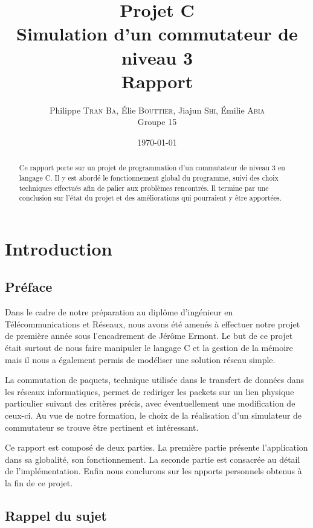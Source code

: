 \documentclass[a4paper,11pt]{article}
\title{Projet C\\Simulation d'un commutateur de niveau 3\\Rapport}
\author{Philippe \textsc{Tran Ba}, Élie \textsc{Bouttier}, Jiajun \textsc{Shi}, Émilie \textsc{Abia}\\Groupe 15}
\date\today
\begin{document}
\maketitle

\begin{abstract}

Ce rapport porte sur un projet de programmation d'un commutateur de niveau 3 en langage C. Il y est abordé le fonctionnement global du programme, suivi des choix techniques effectués afin de palier aux problèmes rencontrés. Il termine par une conclusion sur l'état du projet et des améliorations qui pourraient y être apportées.

\end{abstract}

\tableofcontents

\newpage

\section{Introduction}
\subsection{Préface}

Dans le cadre de notre préparation au diplôme d'ingénieur en Télécommunications et Réseaux, nous avons été amenés à effectuer notre projet de première année sous l'encadrement de Jérôme Ermont. Le but de ce projet était surtout de nous faire manipuler le langage C et la gestion de la mémoire mais il nous a également permis de modéliser une solution réseau simple.

La commutation de paquets, technique utilisée dans le transfert de données dans les réseaux informatiques, permet de rediriger les packets sur un lien physique particulier suivant des critères précis, avec éventuellement une modification de ceux-ci. Au vue de notre formation, le choix de la réalisation d'un simulateur de commutateur se trouve être pertinent et intéressant.

Ce rapport est composé de deux parties. La première partie présente l'application dans sa globalité, son fonctionnement. La seconde partie est consacrée au détail de l'implémentation. Enfin nous conclurons sur les apports personnels obtenus à la fin de ce projet.

\subsection{Rappel du sujet}
\end{document}
